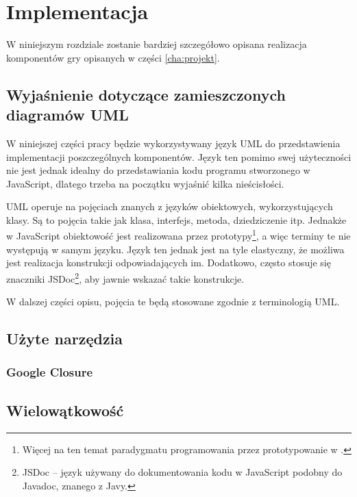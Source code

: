 \chapter{Implementacja}
\label{cha:implementacja}

W niniejszym rozdziale zostanie bardziej szczegółowo opisana realizacja komponentów
gry opisanych w części \ref{cha:projekt}.

\section{Wyjaśnienie dotyczące zamieszczonych diagramów UML}
\label{sec:uml}

W niniejszej części pracy będzie wykorzystywany język UML do przedstawienia implementacji
poszczególnych komponentów. Język ten pomimo swej użyteczności nie jest jednak idealny
do przedstawiania kodu programu stworzonego w JavaScript, dlatego trzeba na początku
wyjaśnić kilka nieścisłości.

UML operuje na pojęciach znanych z języków obiektowych, wykorzystujących klasy. Są to pojęcia
takie jak klasa, interfejs, metoda, dziedziczenie itp. Jednakże w JavaScript obiektowość
jest realizowana przez prototypy\footnote{Więcej na ten temat paradygmatu programowania
  przez prototypowanie w \cite{js-definitive}.}, a więc
terminy te nie występują w samym języku. Język ten jednak jest na tyle elastyczny, że możliwa
jest realizacja konstrukcji odpowiadających im. Dodatkowo, często stosuje się znaczniki
JSDoc\footnote{JSDoc -- język używany do dokumentowania kodu w JavaScript podobny do
  Javadoc, znanego z Javy.}, aby jawnie wskazać takie konstrukcje.

W dalszej części opisu, pojęcia te będą stosowane zgodnie z terminologią UML.

\section{Użyte narzędzia}
\label{sec:uzyteNarzedzia}

\subsection{Google Closure}
\label{ssec:googleClosure}

\section{Wielowątkowość}
\label{sec:wielowatkowosc}


